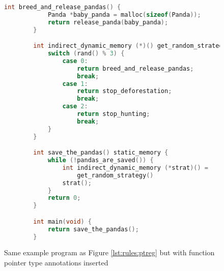 \begin{figure}
    \begin{lstlisting}[language=C,gobble=8]
        int breed_and_release_pandas() {
            Panda *baby_panda = malloc(sizeof(Panda));
            return release_panda(baby_panda);
        }

        int indirect_dynamic_memory (*)() get_random_strategy() {
            switch (rand() % 3) {
                case 0:
                    return breed_and_release_pandas;
                    break;
                case 1:
                    return stop_deforestation;
                    break;
                case 2:
                    return stop_hunting;
                    break;
            }
        }

        int save_the_pandas() static_memory {
            while (!pandas_are_saved()) {
                int indirect_dynamic_memory (*strat)() =
                    get_random_strategy()
                strat();
            }
            return 0;
        }

        int main(void) {
            return save_the_pandas();
        }
    \end{lstlisting}
    \caption{Same example program as Figure \ref{lst:rules:ptreg} but with function pointer type annotations inserted}
    \label{lst:rules:pandaptrannote}
\end{figure}

